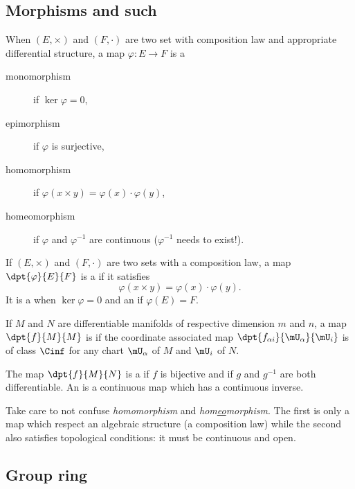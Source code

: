 \subsection{Morphisms and such}

When $(E,\times)$ and $(F,\cdot)$ are two set with composition law and appropriate differential structure, a map $\varphi\colon E\to F$ is a
\begin{description}
	\item[monomorphism] if $\ker\varphi=0$,
	\item[epimorphism]  if $\varphi$ is surjective,
	\item[homomorphism] if $\varphi(x\times y)=\varphi(x)\cdot\varphi(y)$,
	\item[homeomorphism] if $\varphi$ and $\varphi^{-1}$ are continuous ($\varphi^{-1}$ needs to exist!).
\end{description}

If $(E,\times)$ and $(F,\cdot)$ are two sets with a composition law, a map $\dpt{\varphi}{E}{F}$ is a  if it satisfies
\[
	\varphi(x\times y)=\varphi(x)\cdot\varphi(y).
\]
It is a  when $\ker\varphi=0$ and an  if $\varphi(E)=F$.

If $M$ and $N$ are differentiable manifolds of respective dimension $m$ and $n$, a map $\dpt{f}{M}{M}$ is  if the coordinate associated map $\dpt{f_{\alpha i}}{\mU_{\alpha}}{\mU_i}$ is of class $\Cinf$ for any chart $\mU_{\alpha}$ of $M$ and $\mU_i$ of $N$.

The map $\dpt{f}{M}{N}$ is a  if $f$ is bijective and if $g$ and $g^{-1}$ are both differentiable. An  is a continuous map which has a continuous inverse.

\begin{remark}
	Take care to not confuse \emph{homomorphism} and \emph{hom\underline{eo}morphism}. The first is only a map which respect an algebraic structure (a composition law) while the second also satisfies topological conditions: it must be continuous and open.
\end{remark}

\subsection{Group ring}


